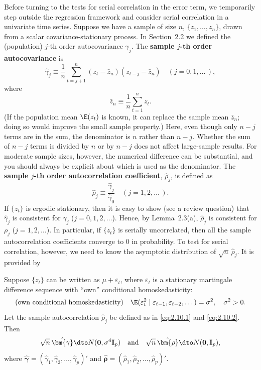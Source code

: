 Before turning to the tests for serial correlation in the error term, we temporarily
step outside the regression framework and consider serial correlation in a univariate time series. Suppose we have a sample of size $n$, $\{z_1, \ldots, z_n\}$, drawn from a
scalar covariance-stationary process. In Section~2.2 we defined the (population)
$j$-th order autocovariance $\gamma_j$. The \textbf{sample $j$-th order autocovariance} is
%
\begin{equation}
\hat{\gamma}_j \equiv \frac{1}{n}\sum_{t=j+1}^{n}(z_t - \bar{z}_n)(z_{t-j} - \bar{z}_n)
\quad (j = 0, 1, \ldots\,),
\label{eq:2.10.1}
\end{equation}
%
where
\[
\bar{z}_n \equiv \frac{1}{n}\sum_{t=1}^{n} z_t.
\]
%
(If the population mean $\E(z_t)$ is known, it can replace the sample mean $\bar{z}_n$; doing
so would improve the small sample property.) Here, even though only $n - j$ terms
are in the sum, the denominator is $n$ rather than $n - j$. Whether the sum of $n - j$
terms is divided by $n$ or by $n - j$ does not affect large-sample results. For moderate
sample sizes, however, the numerical difference can be substantial, and you should
always be explicit about which is used as the denominator. The \textbf{sample $j$-th order
autocorrelation coefficient}, $\hat{\rho}_j$, is defined as
%
\begin{equation}
\hat{\rho}_j \equiv \frac{\hat{\gamma}_j}{\hat{\gamma}_0}
\quad (j = 1, 2, \ldots\,).
\label{eq:2.10.2}
\end{equation}
%
If $\{z_t\}$ is ergodic stationary, then it is easy to show (see a review question) that
$\hat{\gamma}_j$ is consistent for $\gamma_j$ ($j = 0, 1, 2, \ldots$). Hence, by Lemma~2.3(a),
$\hat{\rho}_j$ is consistent for $\rho_j$ ($j = 1, 2, \ldots$). In particular, if $\{z_t\}$ is serially uncorrelated,
then all the sample autocorrelation coefficients converge to 0 in probability. To test for
serial correlation, however, we need to know the asymptotic distribution of
$\sqrt{n}\,\hat{\rho}_j$. It is provided by

\begin{proposition}
\label{prop:2.9}
Suppose $\{z_t\}$ can be written as $\mu + \varepsilon_t$, where $\varepsilon_t$ is a stationary
martingale difference sequence with ``own'' conditional homoskedasticity:
\[
\textup{(own conditional homoskedasticity)}\quad
\E(\varepsilon_t^2 \mid \varepsilon_{t-1}, \varepsilon_{t-2}, \ldots\,) = \sigma^2,
\quad \sigma^2 > 0.
\]
Let the sample autocorrelation $\hat{\rho}_j$ be defined as in \eqref{eq:2.10.1} and \eqref{eq:2.10.2}. Then
\[
\sqrt{n}\,\hat{\bm{\gamma}} \dto N(\mathbf{0}, \sigma^4 \mathbf{I}_p)
\quad \text{and} \quad
\sqrt{n}\,\hat{\bm{\rho}} \dto N(\mathbf{0}, \mathbf{I}_p),
\]
where $\hat{\bm{\gamma}} = (\hat{\gamma}_1, \hat{\gamma}_2, \ldots, \hat{\gamma}_p)'$
and $\hat{\bm{\rho}} = (\hat{\rho}_1, \hat{\rho}_2, \ldots, \hat{\rho}_p)'$.
\end{proposition}

